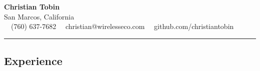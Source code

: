 \documentclass[11pt,letterpaper]{article}
\begin{document}
\begin{center}
    {\LARGE \textbf{Christian Tobin}}\\
    San Marcos, California
    \vspace{0.05cm}
    \\
    \raisebox{-0.2\height} {\Large \faPhoneSquare} \ \ (760) 637-7682 \hfill\raisebox{-0.2\height}{\Large \faEnvelopeSquare} \ \ christian@wirelesseco.com \hfill \raisebox{-0.2\height}{\Large \faGithubSquare} \ \ github.com/christiantobin  
\end{center}

\hrule
\vspace{-1em}
\subsection*{\Large Experience}
\end{document}
